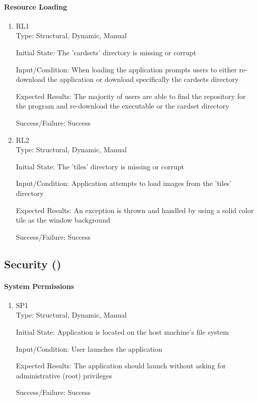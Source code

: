 \documentclass[12pt, titlepage]{article}
\begin{document}
	\paragraph{Resource Loading}
	\begin{enumerate}
		\item{RL1\\}
		Type: Structural, Dynamic, Manual
		
		Initial State: The 'cardsets' directory is missing or corrupt
		
		Input/Condition: When loading the application prompts users to either
		re-download the application or download specifically the cardsets directory
		
		Expected Results: The majority of users are able to find the repository for the
		program and re-download the executable or the cardset directory

		Success/Failure: Success
		
		\item{RL2\\}
		Type: Structural, Dynamic, Manual
		
		Initial State: The 'tiles' directory is missing or corrupt
		
		Input/Condition: Application attempts to load images from the 'tiles' directory
		
		Expected Results: An exception is thrown and handled by using a solid color tile
		as the window background

		Success/Failure: Success
	\end{enumerate}
	
	\subsection{Security ()}
	\paragraph{System Permissions}
	\begin{enumerate}
		\item{SP1\\}
		Type: Structural, Dynamic, Manual
		
		Initial State: Application is located on the host machine's file system
		
		Input/Condition: User launches the application
		
		Expected Results: The application should launch without asking for administrative
		(root) privileges

		Success/Failure: Success
	\end{enumerate}
\end{document}
